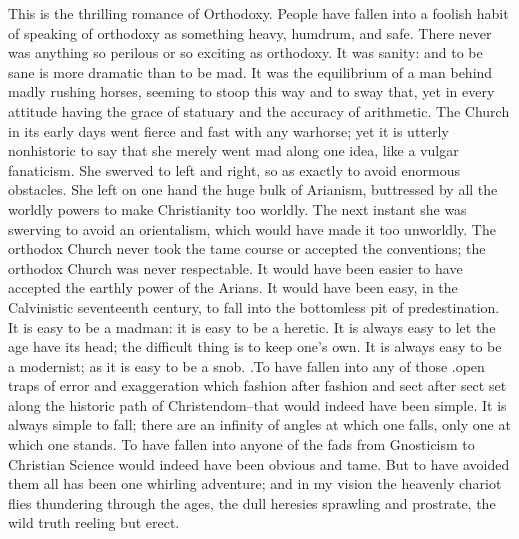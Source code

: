\documentclass{book}
\begin{document}
This is the thrilling romance of Orthodoxy. People have fallen into a foolish habit of speaking of orthodoxy as something heavy, humdrum, and safe. There never was anything so perilous or so exciting as orthodoxy. It was sanity: and to be sane is more dramatic than to be mad. It was the equilibrium of a man behind madly rushing horses, seeming to stoop this way and to sway that, yet in every attitude having the grace of statuary and the accuracy of arithmetic. The Church in its early days went fierce and fast with any warhorse; yet it is utterly nonhistoric to say that she merely went mad along one idea, like a vulgar fanaticism. She swerved to left and right, so as exactly to avoid enormous obstacles. She left on one hand the huge bulk of Arianism, buttressed by all the worldly powers to make Christianity too worldly. The next instant she was swerving to avoid an orientalism, which would have made it too unworldly. The orthodox Church never took the tame course or accepted the conventions; the orthodox Church was never respectable. It would have been easier to have accepted the earthly power of the Arians. It would have been easy, in the Calvinistic seventeenth century, to fall into the bottomless pit of predestination. It is easy to be a madman: it is easy to be a heretic. It is always easy to let the age have its head; the difficult thing is to keep one’s own. It is always easy to be a modernist; as it is easy to be a snob. .To have fallen into any of those .open traps of error and exaggeration which fashion after fashion and sect after sect set along the historic path of Christendom–that would indeed have been simple. It is always simple to fall; there are an infinity of angles at which one falls, only one at which one stands. To have fallen into anyone of the fads from Gnosticism to Christian Science would indeed have been obvious and tame. But to have avoided them all has been one whirling adventure; and in my vision the heavenly chariot flies thundering through the ages, the dull heresies sprawling and prostrate, the wild truth reeling but erect.
\end{document}
